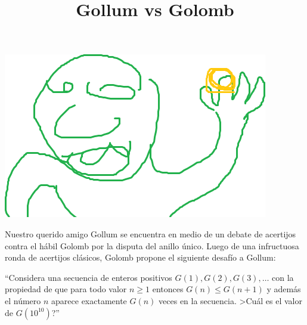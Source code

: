 \documentclass{oci}
\title{Gollum vs Golomb}
\begin{document}
\begin{problemDescription}
\begin{center}
	\includegraphics[scale=0.3]{gollum.png}
\end{center}
Nuestro querido amigo Gollum se encuentra en medio de un debate de acertijos contra el hábil Golomb por la disputa del anillo único.
Luego de una infructuosa ronda de acertijos clásicos, Golomb propone el siguiente desafío a Gollum:

``Considera una secuencia de enteros positivos $G(1), G(2), G(3),\dots$ con la propiedad de que para todo valor $n \geq 1$ entonces $G(n) \leq G(n+1)$ y además el número $n$ aparece exactamente $G(n)$ veces en la secuencia. >Cuál es el valor de $G(10^{10})$?''


\end{problemDescription}
\end{document}
